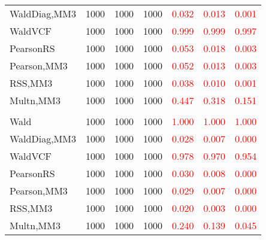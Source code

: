 \documentclass[
]{article}
\begin{document}
\begin{table}[H]
{\begin{tabular}[t]{lrrrrrr}
\hspace{1em}WaldDiag,MM3 & 1000 & 1000 & 1000 & \textcolor{red}{0.032} & \textcolor{red}{0.013} & \textcolor{red}{0.001}\\
\hspace{1em}WaldVCF & 1000 & 1000 & 1000 & \textcolor{red}{0.999} & \textcolor{red}{0.999} & \textcolor{red}{0.997}\\
\hspace{1em}PearsonRS & 1000 & 1000 & 1000 & \textcolor{red}{0.053} & \textcolor{red}{0.018} & \textcolor{red}{0.003}\\
\hspace{1em}Pearson,MM3 & 1000 & 1000 & 1000 & \textcolor{red}{0.052} & \textcolor{red}{0.013} & \textcolor{red}{0.003}\\
\hspace{1em}RSS,MM3 & 1000 & 1000 & 1000 & \textcolor{red}{0.038} & \textcolor{red}{0.010} & \textcolor{red}{0.001}\\
\hspace{1em}Multn,MM3 & 1000 & 1000 & 1000 & \textcolor{red}{0.447} & \textcolor{red}{0.318} & \textcolor{red}{0.151}\\
\addlinespace[0.3em]
\multicolumn{7}{l}{\textbf{3F 15V}}\\
\hspace{1em}Wald & 1000 & 1000 & 1000 & \textcolor{red}{1.000} & \textcolor{red}{1.000} & \textcolor{red}{1.000}\\
\hspace{1em}WaldDiag,MM3 & 1000 & 1000 & 1000 & \textcolor{red}{0.028} & \textcolor{red}{0.007} & \textcolor{red}{0.000}\\
\hspace{1em}WaldVCF & 1000 & 1000 & 1000 & \textcolor{red}{0.978} & \textcolor{red}{0.970} & \textcolor{red}{0.954}\\
\hspace{1em}PearsonRS & 1000 & 1000 & 1000 & \textcolor{red}{0.030} & \textcolor{red}{0.008} & \textcolor{red}{0.000}\\
\hspace{1em}Pearson,MM3 & 1000 & 1000 & 1000 & \textcolor{red}{0.029} & \textcolor{red}{0.007} & \textcolor{red}{0.000}\\
\hspace{1em}RSS,MM3 & 1000 & 1000 & 1000 & \textcolor{red}{0.020} & \textcolor{red}{0.003} & \textcolor{red}{0.000}\\
\hspace{1em}Multn,MM3 & 1000 & 1000 & 1000 & \textcolor{red}{0.240} & \textcolor{red}{0.139} & \textcolor{red}{0.045}\\
\bottomrule
\end{tabular}}
\endgroup{}
\end{table}
\end{document}
